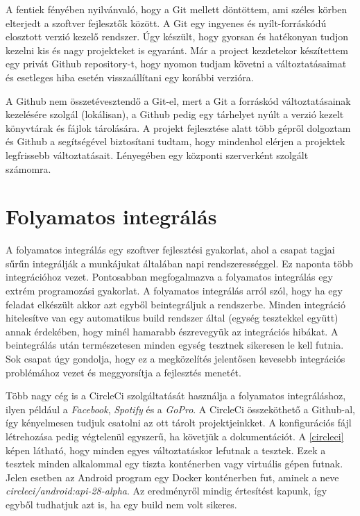 \documentclass{thesis-ekf}
\theoremstyle{definition}
\theoremstyle{remark}
\begin{document}
A fentiek fényében nyilvánvaló, hogy a Git mellett döntöttem, ami széles körben elterjedt a szoftver fejlesztők között.
A Git egy ingyenes és nyílt-forráskódú elosztott verzió kezelő rendszer. Úgy készült, hogy gyorsan és hatékonyan tudjon kezelni kis és nagy projekteket is egyaránt.
Már a project kezdetekor készítettem egy privát Github repository-t, hogy nyomon tudjam követni a változtatásaimat és esetleges hiba esetén visszaállítani egy korábbi verzióra.

A Github nem összetévesztendő a Git-el, mert a Git a forráskód változtatásainak kezelésére szolgál (lokálisan), a Github pedig egy tárhelyet nyúlt a verzió kezelt könyvtárak és fájlok tárolására.
A projekt fejlesztése alatt több gépről dolgoztam és Github a segítségével biztosítani tudtam, hogy mindenhol elérjen a projektek legfrissebb változtatásait.
Lényegében egy központi szerverként szolgált számomra.

\section{Folyamatos integrálás}

A folyamatos integrálás egy szoftver fejlesztési gyakorlat, ahol a csapat tagjai sűrűn integrálják a munkájukat általában napi rendszerességgel. 
Ez naponta több integrációhoz vezet. Pontosabban megfogalmazva a folyamatos integrálás egy extrém programozási gyakorlat.
A folyamatos integrálás arról szól, hogy ha egy feladat elkészült akkor azt egyből beintegráljuk a rendszerbe.
Minden integráció hitelesítve van egy automatikus build rendszer által (egység tesztekkel együtt) annak érdekében, hogy minél hamarabb észrevegyük az integrációs hibákat.
A beintegrálás után természetesen minden egység tesztnek sikeresen le kell futnia.
Sok csapat úgy gondolja, hogy ez a megközelítés jelentősen kevesebb integrációs problémához vezet és meggyorsítja a fejlesztés menetét.\cite{continuous_integration}

Több nagy cég is a CircleCi szolgáltatását használja a folyamatos integráláshoz, ilyen például a \emph{Facebook}, \emph{Spotify} és a \emph{GoPro}.
A CircleCi összeköthető a Github-al, így kényelmesen tudjuk csatolni az ott tárolt projektjeinkket.
A konfigurációs fájl létrehozása pedig végtelenül egyszerű, ha követjük a dokumentációt.
A \ref{circleci} képen látható, hogy minden egyes változtatáskor lefutnak a tesztek.
Ezek a tesztek minden alkalommal egy tiszta konténerben vagy virtuális gépen futnak.
Jelen esetben az Android program egy Docker konténerben fut, aminek a neve \emph{circleci/android:api-28-alpha}.
Az eredményről mindig értesítést kapunk, így egyből tudhatjuk azt is, ha egy build nem volt sikeres.
\end{document}
